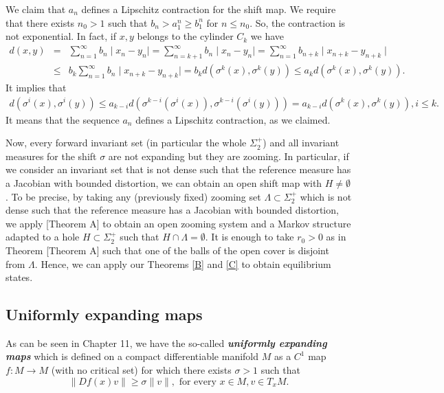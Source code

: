 \documentclass[12pt,a4paper]{amsart}
\theoremstyle{plain}
\begin{document}
We claim that $a_{n}$ defines a Lipschitz contraction for the shift map. We require that there exists $n_{0} > 1$ such that $b_{n} > a_{1}^{n} \geq b_{1}^{n}$ for $n \leq n_{0}$. So, the contraction is not exponential. In fact, if $x,y$ belongs to the cylinder $C_{k}$ we have
\begin{eqnarray*}
	\displaystyle d(x,y) &=& \sum_{n=1}^{\infty} b_{n}\mid x_{n} - y_{n} \mid = \sum_{n=k+1}^{\infty} b_{n}\mid x_{n} - y_{n} \mid = \sum_{n=1}^{\infty} b_{n+k}\mid x_{n+k} - y_{n+k} \mid\\
	&\leq& b_{k} \sum_{n=1}^{\infty} b_{n}\mid x_{n+k} - y_{n+k} \mid = b_{k} d(\sigma^{k}(x),\sigma^{k}(y)) \leq a_{k} d(\sigma^{k}(x),\sigma^{k}(y)).
\end{eqnarray*}
It implies that
\begin{eqnarray*}
	\displaystyle d(\sigma^{i}(x),\sigma^{i}(y)) \leq  a_{k-i} d(\sigma^{k-i}(\sigma^{i}(x)),\sigma^{k-i}(\sigma^{i}(y)))= a_{k-i}d(\sigma^{k}(x),\sigma^{k}(y)), i \leq k.
\end{eqnarray*}
It means that the sequence $a_{n}$ defines a Lipschitz contraction, as we claimed.

Now, every forward invariant set (in particular the whole $\Sigma_{2}^{+}$)  and all invariant measures for the shift $\sigma$ are not expanding but they are  zooming. In particular, if we consider an invariant set that is not dense such that the reference measure has a Jacobian with bounded distortion, we can obtain an open shift map with $H \neq \emptyset$. To be precise, by taking any (previously fixed) zooming set $\Lambda \subset \Sigma_{2}^{+}$ which is not dense such that the reference measure has a Jacobian with bounded distortion, we apply \cite{S}[Theorem A] to obtain an open zooming system and a Markov structure adapted to a hole $H \subset \Sigma_{2}^{+}$ such that $H \cap \Lambda = \emptyset$. It is enough to take $r_{0}>0$ as in Theorem \cite{S}[Theorem A] such that one of the balls of the open cover is disjoint from $\Lambda$. Hence, we can apply our Theorems \ref{B} and \ref{C} to obtain equilibrium states.



\subsection{Uniformly expanding maps} As can be seen in \cite{OV} Chapter 11, we have the so-called \textbf{\textit{uniformly expanding maps}} which is defined on a compact differentiable manifold $M$ as a $C^{1}$ map $f:M \to M$ (with no critical set) for which there exists $\sigma > 1$ such that
\[
\|Df(x)v\|\geq \sigma \|v\|, \,\, \text{for every} \,\, x \in M, v \in T_{x}M.
\]
\end{document}
